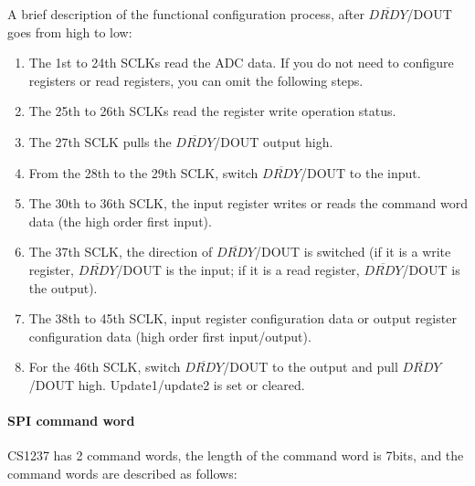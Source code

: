 \documentclass{article}
\begin{document}
A brief description of the functional configuration process, after $\overline{DRDY}$/DOUT goes from high to low:

\begin{enumerate}
    \item The 1st to 24th SCLKs read the ADC data. If you do not need to configure registers or read registers, you can omit the following steps.
    \item The 25th to 26th SCLKs read the register write operation status.
    \item The 27th SCLK pulls the $\overline{DRDY}$/DOUT output high.
    \item From the 28th to the 29th SCLK, switch $\overline{DRDY}$/DOUT to the input.
    \item The 30th to 36th SCLK, the input register writes or reads the command word data (the high order first input).
    \item The 37th SCLK, the direction of $\overline{DRDY}$/DOUT is switched (if it is a write register, $\overline{DRDY}$/DOUT is the input; if it is a read register, $\overline{DRDY}$/DOUT is the output).
    \item The 38th to 45th SCLK, input register configuration data or output register configuration data (high order first input/output).
    \item For the 46th SCLK, switch $\overline{DRDY}$/DOUT to the output and pull $\overline{DRDY}$/DOUT high. Update1/update2 is set or cleared.
\end{enumerate}

\paragraph{SPI command word}

CS1237 has 2 command words, the length of the command word is 7bits, and the command words are described as follows:

\begin{table}[h]
    \caption{Command word description table}
    \label{tab:table10}
\end{table}
\end{document}
